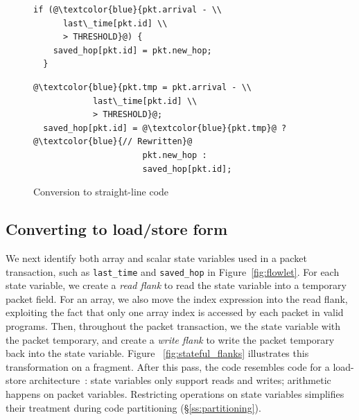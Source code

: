 \begin{figure}[!t]
  \begin{minipage}{0.47\textwidth}
  \begin{small}
  \begin{lstlisting}[style=customc]
  if (@\textcolor{blue}{pkt.arrival - \\
      last\_time[pkt.id] \\
      > THRESHOLD}@) {
    saved_hop[pkt.id] = pkt.new_hop;
  }
  \end{lstlisting}
  \end{small}
  \end{minipage}
  \begin{minipage}{0.53\textwidth}
  \begin{small}
  \begin{lstlisting}[style=customc]
  @\textcolor{blue}{pkt.tmp = pkt.arrival - \\
            last\_time[pkt.id] \\
            > THRESHOLD}@;
  saved_hop[pkt.id] = @\textcolor{blue}{pkt.tmp}@ ? @\textcolor{blue}{// Rewritten}@
                      pkt.new_hop :
                      saved_hop[pkt.id];
  \end{lstlisting}
  \end{small}
  \end{minipage}
\caption{Conversion to straight-line code}
\label{fig:if_convert}
\end{figure}
\subsection{Converting to load/store form}

We next identify both array and scalar state variables used in a packet
transaction, such as \texttt{last\_time} and \texttt{saved\_hop} in
Figure~\ref{fig:flowlet}. For each state variable, we create a \textit{read
flank} to read the state variable into a temporary packet field. For an array,
we also move the index expression into the read flank, exploiting the fact that
only one array index is accessed by each packet in valid \pktlanguage programs.
Then, throughout the packet transaction, we the state variable with the packet
temporary, and create a \textit{write flank} to write the packet temporary back
into the state variable.  Figure ~\ref{fig:stateful_flanks} illustrates this
transformation on a fragment.  After this pass, the code resembles code for a
load-store architecture~\cite{load_store}: state variables only support reads
and writes; arithmetic happens on packet variables.  Restricting operations on
state variables simplifies their treatment during code partitioning
(\S\ref{ss:partitioning}).


